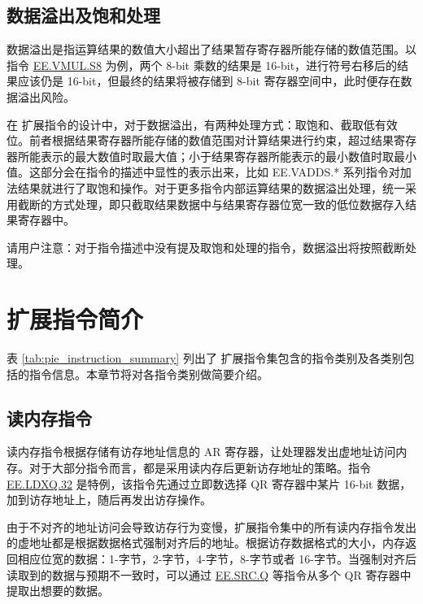 \documentclass[main\_\_CN.tex]{subfiles}
\begin{document}
\subsection{数据溢出及饱和处理}

数据溢出是指运算结果的数值大小超出了结果暂存寄存器所能存储的数值范围。以指令 \hyperref[instruction:EEVMULS8]{EE.VMUL.S8} 为例，两个 8-bit 乘数的结果是 16-bit，进行符号右移后的结果应该仍是 16-bit，但最终的结果将被存储到 8-bit 寄存器空间中，此时便存在数据溢出风险。

在 \chipname{} 扩展指令的设计中，对于数据溢出，有两种处理方式：取饱和、截取低有效位。前者根据结果寄存器所能存储的数值范围对计算结果进行约束，超过结果寄存器所能表示的最大数值时取最大值；小于结果寄存器所能表示的最小数值时取最小值。这部分会在指令的描述中显性的表示出来，比如 EE.VADDS.* 系列指令对加法结果就进行了取饱和操作。对于更多指令内部运算结果的数据溢出处理，统一采用截断的方式处理，即只截取结果数据中与结果寄存器位宽一致的低位数据存入结果寄存器中。

请用户注意：对于指令描述中没有提及取饱和处理的指令，数据溢出将按照截断处理。

\section{扩展指令简介}\label{chp:pie_instruction_simple_introduction}

表 \ref{tab:pie_instruction_summary} 列出了 \chipname{} 扩展指令集包含的指令类别及各类别包括的指令信息。本章节将对各指令类别做简要介绍。

\clearpage


\subsection{读内存指令}
\label{sec:pie-load-instrucitons}

读内存指令根据存储有访存地址信息的 AR 寄存器，让处理器发出虚地址访问内存。对于大部分指令而言，都是采用读内存后更新访存地址的策略。指令 \hyperref[instruction:EELDXQ32]{EE.LDXQ.32} 是特例，该指令先通过立即数选择 QR 寄存器中某片 16-bit 数据，加到访存地址上，随后再发出访存操作。

由于不对齐的地址访问会导致访存行为变慢，扩展指令集中的所有读内存指令发出的虚地址都是根据数据格式强制对齐后的地址。根据访存数据格式的大小，内存返回相应位宽的数据：1-字节，2-字节，4-字节，8-字节或者 16-字节。当强制对齐后读取到的数据与预期不一致时，可以通过 \hyperref[instruction:EESRCQ]{EE.SRC.Q} 等指令从多个 QR 寄存器中提取出想要的数据。
\end{document}
